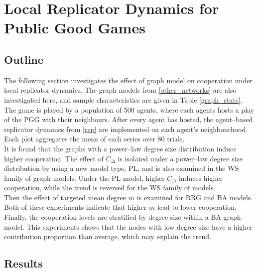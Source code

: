 \section{Local Replicator Dynamics for Public Good Games}
\subsection{Outline}
The following section investigates the effect of graph model on cooperation under local replicator dynamics. The graph models from \ref{other_networks} are also investigated here, and sample characteristics are given in Table \ref{graph_stats}. The game is played by a population of 500 agents, where each agents hosts a play of the PGG with their neighbours. After every agent has hosted, the agent--based replicator dynamics from \eqref{rep} are implemented on each agent's neighbourhood. Each plot aggregates the mean of each series over 80 trials.  \\
It is found that the graphs with a power--law degree size distribution induce higher cooperation. The effect of $C_\Delta$ is isolated under a power--law degree size distribution by using a new model type, PL, and is also examined in the WS family of graph models. Under the PL model, higher $C_\Delta$ induces higher cooperation, while the trend is reversed for the WS family of models. \\

Then the effect of targeted mean degree $m$ is examined for RRG and BA models. Both of these experiments indicate that higher $m$ lead to lower cooperation. Finally, the cooperation levels are stratified by degree size within a BA graph model. This experiments shows that the nodes with low degree size have a higher contribution proportion than average, which may explain the trend. \\

\subsection{Results}
\FloatBarrier
{} 
\FloatBarrier
{}
\FloatBarrier
{}\FloatBarrier


